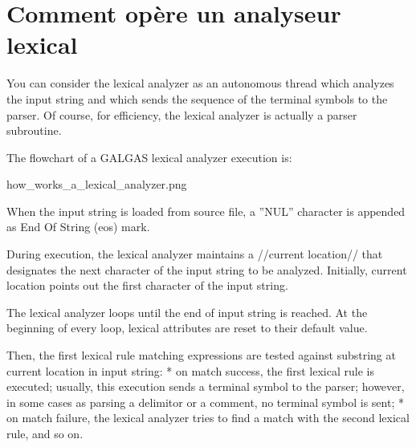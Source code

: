 {%
%
%


\section{Comment opère un analyseur lexical}

You can consider the lexical analyzer as an autonomous thread which analyzes the input string and which sends the sequence of the terminal symbols to the parser. Of course, for efficiency, the lexical analyzer is actually a parser subroutine.

The flowchart of a GALGAS lexical analyzer execution is:

{{ how\_works\_a\_lexical\_analyzer.png }}

When the input string is loaded from source file, a ''NUL'' character is appended as End Of String (eos) mark.

During execution, the lexical analyzer maintains a //current location// that designates the next character of the input string to be analyzed. Initially, current location points out the first character of the input string.

The lexical analyzer loops until the end of input string is reached. At the beginning of every loop, lexical attributes are reset to their default value.

Then, the first lexical rule matching expressions are tested against substring at current location in input string:
  * on match success, the first lexical rule is executed; usually, this execution sends a terminal symbol to the parser; however, in some cases as parsing a delimitor or a comment, no terminal symbol is sent;
  * on match failure, the lexical analyzer tries to find a match with the second lexical rule, and so on.

}
